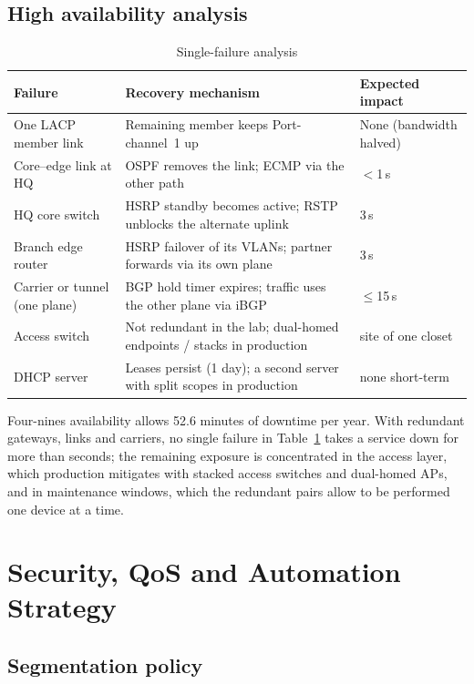 \documentclass[11pt,a4paper]{article}
\begin{document}
\subsection{High availability analysis}
\label{sec:ha}

\begin{table}[H]
\centering\small
\caption{Single-failure analysis}
\label{tab:spof}
\begin{tabularx}{\linewidth}{@{}p{3.6cm}X p{2.6cm}@{}}
\toprule
\textbf{Failure} & \textbf{Recovery mechanism} & \textbf{Expected impact}\\
\midrule
One LACP member link & Remaining member keeps Port-channel~1 up & None (bandwidth halved)\\
Core--edge link at HQ & OSPF removes the link; ECMP via the other path & $<$1\,s\\
HQ core switch & HSRP standby becomes active; RSTP unblocks the alternate uplink & 3\,s\\
Branch edge router & HSRP failover of its VLANs; partner forwards via its own plane & 3\,s\\
Carrier or tunnel (one plane) & BGP hold timer expires; traffic uses the other plane via iBGP & $\le$15\,s\\
Access switch & Not redundant in the lab; dual-homed endpoints / stacks in production & site of one closet\\
DHCP server & Leases persist (1 day); a second server with split scopes in production & none short-term\\
\bottomrule
\end{tabularx}
\end{table}

Four-nines availability allows 52.6 minutes of downtime per year. With redundant gateways, links and carriers, no single failure in Table~\ref{tab:spof} takes a service down for more than seconds; the remaining exposure is concentrated in the access layer, which production mitigates with stacked access switches and dual-homed APs, and in maintenance windows, which the redundant pairs allow to be performed one device at a time.

\section{Security, QoS and Automation Strategy}
\label{sec:secqos}

\subsection{Segmentation policy}
\label{sec:sec}
\end{document}
